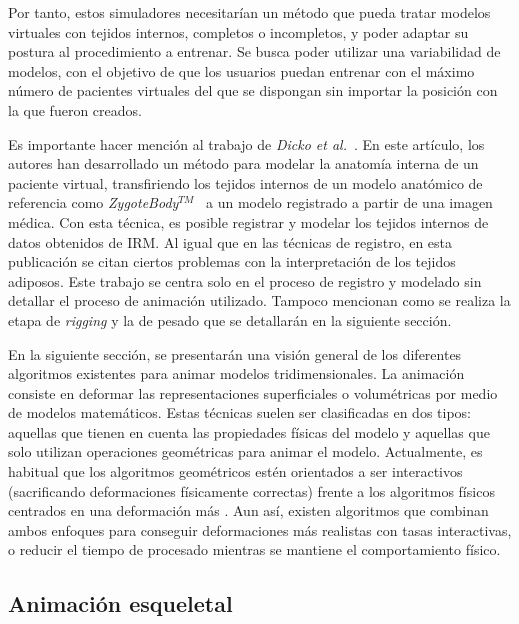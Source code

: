 Por tanto, estos simuladores necesitarían un método que pueda tratar modelos virtuales con tejidos internos, completos o incompletos, y poder adaptar su postura al procedimiento a entrenar. Se busca poder utilizar una variabilidad de modelos, con el objetivo de que los usuarios puedan entrenar con el máximo número de pacientes virtuales del que se dispongan sin importar la posición con la que fueron creados.

Es importante hacer mención al trabajo de  \emph{Dicko et al.}~\cite{Ali2013}.  En este artículo, los autores han desarrollado un método para modelar la anatomía interna de un paciente virtual, transfiriendo los tejidos internos de un modelo anatómico de referencia como \emph{ZygoteBody}$^{TM}$~\cite{kelc2012zygote} a un modelo registrado a partir de una imagen médica. Con esta técnica, es posible registrar y modelar los tejidos internos de datos obtenidos de \ac{IRM}. Al igual que en las técnicas de registro, en esta publicación se citan ciertos problemas con la interpretación de los tejidos adiposos. Este trabajo se centra solo en el proceso de registro y modelado sin detallar el proceso de animación utilizado. Tampoco mencionan como se realiza la etapa de \emph{rigging} y la de pesado que se detallarán en la siguiente sección.  


En la siguiente sección, se presentarán una visión general de los diferentes algoritmos existentes para animar modelos tridimensionales. La animación consiste en deformar las representaciones superficiales  o volumétricas por medio de modelos matemáticos. Estas técnicas suelen ser clasificadas en dos tipos: aquellas que tienen en cuenta las propiedades físicas del modelo y aquellas que solo utilizan operaciones geométricas para animar el modelo. Actualmente, es habitual que los algoritmos geométricos estén orientados a ser interactivos (sacrificando deformaciones físicamente correctas) frente a los algoritmos físicos centrados en una deformación más  . Aun así, existen algoritmos que combinan ambos enfoques para conseguir deformaciones más realistas con tasas interactivas, o reducir el tiempo de procesado mientras se mantiene el comportamiento físico. 


\subsection{Animación esqueletal}
\label{art:animation}
\label{art:virtualskel}


